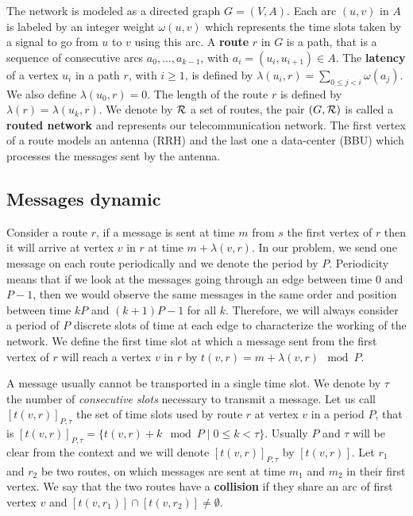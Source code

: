 \documentclass[a4paper,10pt]{article}
\begin{document}
{The network is modeled as a directed graph $G=(V,A)$. Each arc  $(u,v)$ in $A$ is labeled by an integer weight $\omega(u,v)$ which represents the time slots taken by a signal to go from $u$ to $v$ using this arc. A {\bf route} $r$ in $G$ is a path, that is a sequence of consecutive arcs $a_0, \ldots , a_{k-1}$, with $a_i=(u_i,u_{i+1}) \in A$.  The {\bf latency} of a vertex $u_i$ in a path $r$, with $i \geq 1$, is defined by $\lambda(u_i,r)= \sum\limits_{0 \leq j <i} \omega(a_j)$. We also define $\lambda(u_0,r)=0$. The length of the route $r$ is defined by $\lambda (r)= \lambda (u_k,r)$.
We denote by $\cal R$ a set of routes, the pair $(G,\cal R)$ is called a {\bf routed network} and represents our telecommunication network.
The first vertex of a route models an antenna (RRH) and the last one a data-center (BBU) which processes the messages sent by the antenna.

   \subsection{Messages dynamic}
      
      Consider a route $r$, if a message is sent at time $m$ from $s$ the first vertex of $r$ then it will arrive at vertex $v$ in $r$ at time $m + \lambda(v,r)$. In our problem, we send one message on each route periodically and we denote the period by $P$.
      Periodicity means that if we look at the messages going through an edge between time $0$ and $P-1$, then we would observe the same messages in the same order and position between time $kP$ and $(k+1)P -1$ for all $k$. 
      Therefore, we will always consider a period of $P$ discrete slots of time at each edge to characterize the working of the network. We define the first time slot at which a message sent from the first vertex of $r$ will reach a vertex $v$ in $r$ by $t(v,r) = m + \lambda(v,r) \mod P$. 
      
      A message usually cannot be transported in a single time slot. We denote by $\tau$ the number 
      of \emph{consecutive slots} necessary to transmit a message. Let us call $[t(v,r)]_{P,\tau}$ the set of time slots used by route $r$ at vertex $v$ in a period $P$, that is $[t(v,r)]_{P,\tau} = \{t(v,r) + k \mod P \mid 0 \leq k < \tau \}$. Usually $P$ and $\tau$ will be clear from the context and we will denote $[t(v,r)]_{P,\tau}$ by $[t(v,r)]$.
      Let $r_1$ and $r_2$ be two routes, on which messages are sent at time $m_1$ and $m_2$ in their first vertex.
      We say that the two routes have a {\bf collision} if they share an arc of first vertex $v$ and $[t(v,r_{1})] \cap [t(v,r_{2})] \neq \emptyset$.
      
}
\end{document}
